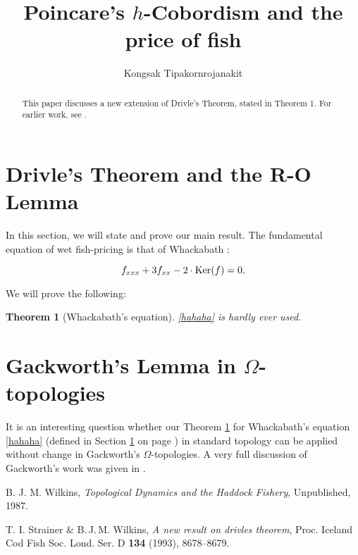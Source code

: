 \documentclass[12pt, a4paper]{article}
\newtheorem{theorem}{Theorem}
\begin{document}
 	\title{Poincare's $h$-Cobordism and the price of fish}
 	\author{Kongsak Tipakornrojanakit}
 	\maketitle
 	
 	\vspace{0.2in}
 	
 	\tableofcontents
 	
 	\vspace{0.4in}
 	
 	
 	\begin{abstract}
 		This paper discusses a new extension of Drivle's Theorem, stated in Theorem 1. For earlier work, see \cite{sw, bjm}.
 	\end{abstract}
 	
 	\section{Drivle's Theorem and the R-O Lemma} \label{DrivleThe}
 	In this section, we will state and prove our main result. The fundamental equation of wet fish-pricing is that of Whackabath \cite{sw}:
 	
		\begin{equation}\label{hahaha}
		f_{xxx} + 3f_{xx} - 2 \cdot  \textnormal{Ker}(f) = 0.
		\end{equation}
		
 	\noindent We will prove the following:
 	
 	\begin{theorem}[Whackabath's equation] \label{the1}
 	\eqref{hahaha} is hardly ever used.
	\end{theorem}
	
 	\section{Gackworth's Lemma in $\Omega$-topologies}
	It is an interesting question whether our Theorem \ref{the1} for Whackabath's equation \eqref{hahaha} (defined in Section \ref{DrivleThe} on page \pageref{DrivleThe}) in standard topology can be applied without change in Gackworth's $\Omega$-topologies. A very full discussion of Gackworth's work was given in \cite{bjm}.

 	\begin{thebibliography}{9}
 	B. J. M. Wilkins,
 	\emph{Topological Dynamics and the Haddock Fishery},
 	Unpublished, 1987.

 	T. I. Strainer \& B.\,J.\,M. Wilkins,
 	\emph{A new result on drivles theorem},
 	Proc. Iceland Cod Fish Soc. Lond. Ser. D \textbf{134} (1993), 8678--8679.
 	\end{thebibliography}
 	
 	
 	
\end{document}
